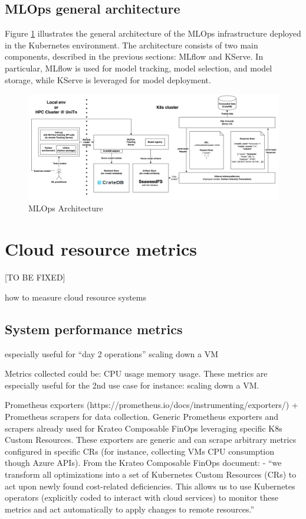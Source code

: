 \subsection{MLOps general architecture}

Figure \ref{fig:mlops} illustrates the general architecture of the MLOps infrastructure deployed in the Kubernetes environment. 
The architecture consists of two main components, described in the previous sections: MLflow and KServe.
In particular, MLflow is used for model tracking, model selection, and model storage, while KServe is leveraged for model deployment. 

\begin{figure}[htb]
  \centering
  \includegraphics[width=1\linewidth]{images/mlops_workflow.png}
  \caption{MLOps Architecture}
  \label{fig:mlops}
\end{figure}

\newpage

\section{Cloud resource metrics}

[TO BE FIXED]



how to measure cloud resource systems


\subsection{System performance metrics}

especially useful for ``day 2 operations''
scaling down a VM

Metrics collected could be:
CPU usage
memory usage.
These metrics are especially useful for the 2nd use case for instance: scaling down a VM.


Prometheus exporters (https://prometheus.io/docs/instrumenting/exporters/) + Prometheus scrapers for data collection.
Generic Prometheus exporters and scrapers already used for Krateo Composable FinOps leveraging specific K8s Custom Resources. These exporters are generic and can scrape arbitrary metrics configured in specific CRs (for instance, collecting VMs CPU consumption though Azure APIs).
From the Krateo Composable FinOps document: 
- “we transform all optimizations into a set of Kubernetes Custom Resources (CRs) to act upon newly found cost-related deficiencies. This allows us to use Kubernetes operators (explicitly coded to interact with cloud services) to monitor these metrics and act automatically to apply changes to remote resources.”

